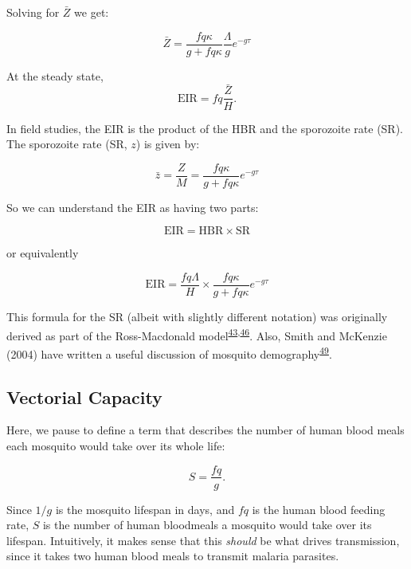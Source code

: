 \documentclass[
]{book}
\begin{document}
Solving for \(\bar Z\) we get:

\begin{equation}
\bar Z =  \frac{f q \kappa}{g + fq \kappa} \frac{\Lambda}{g} e^{-g\tau} 
\end{equation}

At the steady state, \[\mbox{EIR} = fq \frac{\bar Z}{H}.\]

In field studies, the EIR is the product of the HBR and the sporozoite rate (SR). The sporozoite rate (SR, \(z\)) is given by:

\begin{equation}
\bar z =  \frac{Z}{M} = \frac{f q \kappa}{g + fq \kappa} e^{-g\tau} 
\end{equation}

So we can understand the EIR as having two parts:

\begin{equation}
\mbox{EIR} = \mbox{HBR} \times  \mbox{SR} 
\end{equation}

or equivalently

\begin{equation}
\mbox{EIR} = \frac{\textstyle{fq\Lambda}}{\textstyle{H}} \times \frac{\textstyle{f q \kappa}}{\textstyle{g + fq \kappa}} e^{-g\tau} 
\end{equation}

This formula for the SR (albeit with slightly different notation) was originally derived as part of the Ross-Macdonald model\textsuperscript{\protect\hyperlink{ref-ArmitageP1953}{43},\protect\hyperlink{ref-MacdonaldG1952Sporozoite}{46}}. Also, Smith and McKenzie (2004) have written a useful discussion of mosquito demography\textsuperscript{\protect\hyperlink{ref-SmithDL2004_Statics}{49}}.

\hypertarget{vectorial-capacity}{%
\subsection{Vectorial Capacity}\label{vectorial-capacity}}

Here, we pause to define a term that describes the number of human blood meals each mosquito would take over its whole life:

\[S = \frac{fq}{g}.\]

Since \(1/g\) is the mosquito lifespan in days, and \(fq\) is the human blood feeding rate, \(S\) is the number of human bloodmeals a mosquito would take over its lifespan. Intuitively, it makes sense that this \emph{should} be what drives transmission, since it takes two human blood meals to transmit malaria parasites.
\end{document}
